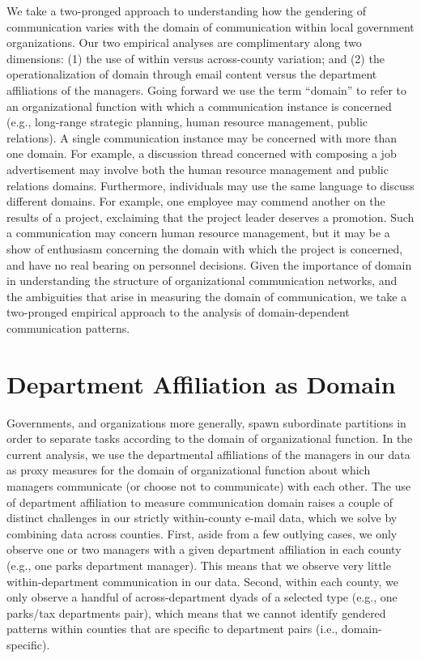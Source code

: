 \documentclass{pnastwo}
\begin{document}
\begin{article}
We take a two-pronged approach to understanding how the gendering of communication varies with the domain of communication within local government organizations. Our two empirical analyses are complimentary along two dimensions: (1) the use of within versus across-county variation; and (2) the operationalization of domain through email content versus the department affiliations of the managers. Going forward we use the term ``domain'' to refer to an organizational function with which a communication instance is concerned (e.g., long-range strategic planning, human resource management, public relations). A single communication instance may be concerned with more than one domain. For example, a discussion thread concerned with composing a job advertisement may involve both the human resource management and public relations domains. Furthermore, individuals may use the same language to discuss different domains. For example, one employee may commend another on the results of a project, exclaiming that the project leader deserves a promotion. Such a communication may concern human resource management, but it may be a show of enthusiasm concerning the domain with which the project is concerned, and have no real bearing on personnel decisions. Given the importance of domain in understanding the structure of organizational communication networks, and the ambiguities that arise in measuring the domain of communication, we take a two-pronged empirical approach to the analysis of domain-dependent communication patterns.


\section{Department Affiliation as Domain}

Governments, and organizations more generally, spawn subordinate partitions in order to separate tasks according to the domain of organizational function. In the current analysis, we use the departmental affiliations of the managers in our data as proxy measures for the domain of organizational function about which managers communicate (or choose not to communicate) with each other. The use of department affiliation to measure communication domain raises a couple of distinct challenges in our strictly within-county e-mail data, which we solve by combining data across counties. First, aside from a few outlying cases, we only observe one or two managers with a given department affiliation in each county (e.g., one parks department manager). This means that we observe very little within-department communication in our data. Second, within each county, we only observe a handful of across-department dyads of a selected type (e.g., one parks/tax departments pair), which means that we cannot identify gendered patterns within counties that are specific to department pairs (i.e., domain-specific).


\end{article}
\end{document}
